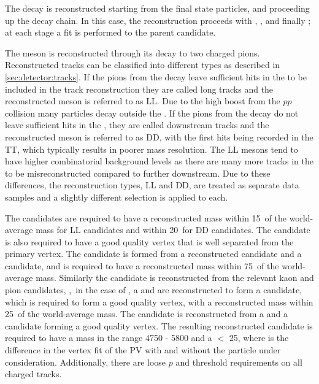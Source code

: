 The decay is reconstructed starting from the final state particles, and proceeding up the decay chain. In this case, the reconstruction proceeds with \decay{\KS}{\pip\pim}, \decay{\Kstarm}{\KS\pim}, \decay{\Dz}{\Km\pip} and finally \decay{\Bm}{\D\Kstarm}; at each stage a fit is performed to the parent candidate.

The \KS meson is reconstructed through its decay to two charged pions. Reconstructed tracks can be classified into different types as described in \sect\ref{sec:detector:tracks}. If the pions from the \KS decay leave sufficient hits in the \velo to be included in the track reconstruction they are called long tracks and the reconstructed \KS meson is referred to as LL. Due to the high boost from the $pp$ collision many \KS particles decay outside the \velo. If the pions from the \KS decay do not leave sufficient hits in the \velo, they are called downstream tracks and the reconstructed \KS meson is referred to as DD, with the first hits being recorded in the TT, which typically results in poorer mass resolution. The LL \KS mesons tend to have higher combinatorial background levels as there are many more tracks in the \velo to be misreconstructed compared to further downstream. Due to these differences, the \KS reconstruction types, LL and DD, are treated as separate data samples and a slightly different selection is applied to each.

The \KS candidates are required to have a reconstructed mass within 15~\mevcc of the world-average mass for LL \KS candidates and within 20~\mevcc for DD \KS candidates. The \KS candidate is also required to have a good quality vertex that is well separated from the primary vertex. The \Kstarm candidate is formed from a reconstructed \KS candidate and a \pim candidate, and is required to have a reconstructed mass within 75~\mevcc of the world-average \Kstarm mass. Similarly the \Dz candidate is reconstructed from the relevant kaon and pion candidates, \eg,~in the case of \kpi, a \Km and \pip are reconstructed to form a \Dz candidate, which is required to form a good quality vertex, with a reconstructed mass within 25~\mevcc of the world-average \Dz mass. The \Bm candidate is reconstructed from a \Dz and a \Kstarm candidate forming a good quality vertex. The resulting reconstructed \Bm candidate is required to have a mass in the range 4750 - 5800 \mevcc and a \chisqip $<$ 25, where \chisqip is the difference in the vertex fit \chisq of the PV with and without the particle under consideration. Additionally, there are loose $p$ and \pt threshold requirements on all charged tracks.

